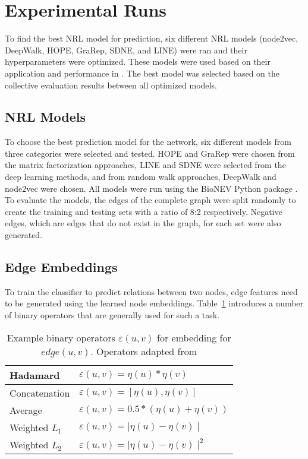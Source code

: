 \section{Experimental Runs}

To find the best \ac{NRL} model for prediction, six different \ac{NRL} models (node2vec, DeepWalk, \ac{HOPE}, \ac{GraRep}, \ac{SDNE}, and \ac{LINE}) were ran and their hyperparameters were optimized.
These models were used based on their application and performance in \cite{yue_graph_2019}.
The best model was selected based on the collective evaluation results between all optimized models.

\subsection{\ac{NRL} Models}

To choose the best prediction model for the network, six different models from three categories were selected and tested.
\ac{HOPE} and \ac{GraRep} were chosen from the matrix factorization approaches, \ac{LINE} and \ac{SDNE} were selected from the deep learning methods, and from random walk approaches, DeepWalk and node2vec were chosen.
All models were run using the BioNEV Python package \cite{yue_graph_2019}.
To evaluate the models, the edges of the complete graph were split randomly to create the training and testing sets with a ratio of 8:2 respectively.
Negative edges, which are edges that do not exist in the graph, for each set were also generated.

\subsection{Edge Embeddings}

To train the classifier to predict relations between two nodes, edge features need to be generated using the learned node embeddings.
Table~\ref{tab:operators} introduces a number of binary operators that are generally used for such a task.

\begin{table}[h!]
    \centering
    \begin{tabular}{ |l|l| }
        \hline
        Hadamard & $\varepsilon(u,v)= \eta(u)*\eta(v)$ \\
        \hline
        Concatenation & $\varepsilon(u,v)=[\eta(u), \eta(v)]$ \\
        \hline
        Average & $\varepsilon(u,v)=0.5*(\eta(u)+\eta(v))$ \\
        \hline
        Weighted $L_{1}$ & $\varepsilon(u,v)=\mid\eta(u)-\eta(v)\mid$ \\
        \hline
        Weighted $L_{2}$ & $\varepsilon(u,v)=\mid\eta(u)-\eta(v)\mid^2$ \\
        \hline
    \end{tabular}
    \caption[Example binary operators $\varepsilon(u,v)$ for embedding for $edge(u,v)$]{Example binary operators $\varepsilon(u,v)$ for embedding for $edge(u,v)$. Operators adapted from \cite{grover_node2vec:_2016}}
    \label{tab:operators}
\end{table}


